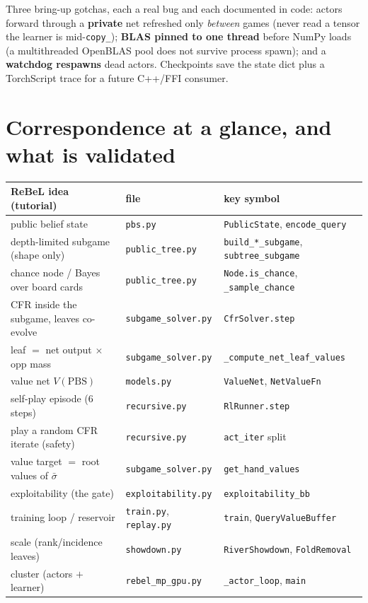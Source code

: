 \documentclass[11pt,a4paper]{article}
\newcommand{\file}[1]{\textcolor{accent}{\texttt{#1}}}
\newcommand{\fn}[1]{\texttt{#1}}
\begin{document}
Three bring-up gotchas, each a real bug and each documented in code: actors
forward through a \textbf{private} net refreshed only \emph{between} games (never
read a tensor the learner is mid-\texttt{copy\_}); \textbf{BLAS pinned to one
thread} before NumPy loads (a multithreaded OpenBLAS pool does not survive
process spawn); and a \textbf{watchdog respawns} dead actors. Checkpoints save the
state dict plus a TorchScript trace for a future C++/FFI consumer.

\section{Correspondence at a glance, and what is validated}

\begin{center}\small
\begin{tabular}{@{}lll@{}}
\toprule
ReBeL idea (tutorial) & file & key symbol \\
\midrule
public belief state                       & \file{pbs.py}            & \fn{PublicState}, \fn{encode\_query} \\
depth-limited subgame (shape only)        & \file{public\_tree.py}   & \fn{build\_*\_subgame}, \fn{subtree\_subgame} \\
chance node / Bayes over board cards      & \file{public\_tree.py}   & \fn{Node.is\_chance}, \fn{\_sample\_chance} \\
CFR inside the subgame, leaves co-evolve  & \file{subgame\_solver.py}& \fn{CfrSolver.step} \\
leaf $=$ net output $\times$ opp mass     & \file{subgame\_solver.py}& \fn{\_compute\_net\_leaf\_values} \\
value net $V(\text{PBS})$                 & \file{models.py}         & \fn{ValueNet}, \fn{NetValueFn} \\
self-play episode (6 steps)               & \file{recursive.py}      & \fn{RlRunner.step} \\
play a random CFR iterate (safety)        & \file{recursive.py}      & \texttt{act\_iter} split \\
value target $=$ root values of $\bar\sigma$& \file{subgame\_solver.py}& \fn{get\_hand\_values} \\
exploitability (the gate)                 & \file{exploitability.py} & \fn{exploitability\_bb} \\
training loop / reservoir                 & \file{train.py}, \file{replay.py} & \fn{train}, \fn{QueryValueBuffer} \\
scale (rank/incidence leaves)             & \file{showdown.py}       & \fn{RiverShowdown}, \fn{FoldRemoval} \\
cluster (actors $+$ learner)              & \file{rebel\_mp\_gpu.py} & \fn{\_actor\_loop}, \fn{main} \\
\bottomrule
\end{tabular}
\end{center}
\end{document}
